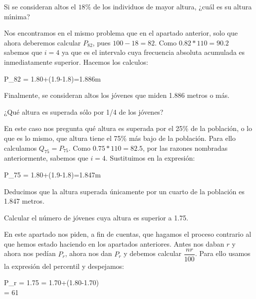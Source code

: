 \subproblem
Si se consideran altos el $18\%$ de los individuos de mayor altura, ¿cuál es su altura mı́nima?

Nos encontramos en el mismo problema que en el apartado anterior, solo que ahora deberemos calcular $P_{82}$, pues $100-18=82$. Como $0.82*110=90.2$ sabemos que $i=4$ ya que es el intervalo cuya frecuencia absoluta acumulada es inmediatamente superior. Hacemos los calculos:
\\
\begin{center}
    \begin{*gather}
        P_{82} = 1.80+(1.9-1.8)=1.886m
    \end{*gather}
\end{center}

Finalmente, se consideran altos los jóvenes que miden 1.886 metros o más.

\subproblem 
¿Qué altura es superada sólo por 1/4 de los jóvenes?

En este caso nos pregunta qué altura es superada por el 25\% de la población, o lo que es lo mismo, que altura tiene el 75\% más bajo de la población. Para ello calculamos $Q_{75} = P_{75}$. Como $0.75*110=82.5$, por las razones nombradas anteriormente, sabemos que $i = 4$. Sustituimos en la expresión:
\\
\begin{center}
    \begin{*gather}
        P_{75} = 1.80+(1.9-1.8)=1.847m
    \end{*gather}
\end{center}

Deducimos que la altura superada únicamente por un cuarto de la población es 1.847 metros.

\subproblem
Calcular el número de jóvenes cuya altura es superior a 1.75.

En este apartado nos piden, a fin de cuentas, que hagamos el proceso contrario al que hemos estado haciendo en los apartados anteriores. Antes nos daban $r$ y ahora nos pedían $P_{r}$, ahora nos dan $P_{r}$ y debemos calcular $\dfrac{nr}{100}$. Para ello usamos la expresión del percentil y despejamos:
\\
\begin{center}
    \begin{*gather}
        P_{r} = 1.75 = 1.70+(1.80-1.70)\\
         = 61\\
    \end{*gather}
\end{center}

